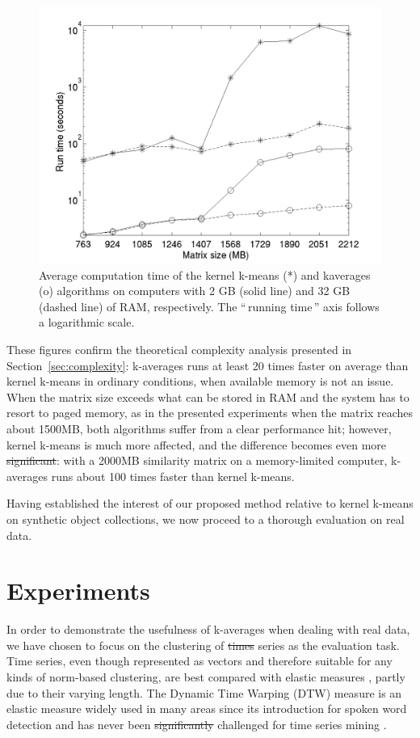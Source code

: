 \documentclass[natbib,smallextended]{svjour3}
\newcommand{\gl}[1]{``\,#1\,''} %
\providecommand{\DIFaddtex}[1]{{\protect\color{blue}\uwave{#1}}} %
\providecommand{\DIFdeltex}[1]{{\protect\color{red}\sout{#1}}}                      %
\providecommand{\DIFaddbegin}{} %
\providecommand{\DIFaddend}{} %
\providecommand{\DIFdelbegin}{} %
\providecommand{\DIFdelend}{} %
\providecommand{\DIFadd}[1]{\texorpdfstring{\DIFaddtex{#1}}{#1}} %
\providecommand{\DIFdel}[1]{\texorpdfstring{\DIFdeltex{#1}}{}} %
\begin{document}
\begin{figure}
\center
\includegraphics[width= .7\textwidth]{figures/simpleSwap.png}
\caption{Average computation time of the kernel k-means (*) and kaverages (o) algorithms on computers with 2 GB (solid line) and 32 GB (dashed line) of RAM, respectively. The \gl{running time} axis follows a logarithmic scale.}
\label{fig:timing}
\end{figure}

These figures confirm the theoretical complexity analysis presented in Section~\ref{sec:complexity}: k-averages runs at least 20 times faster on average than kernel k-means in ordinary conditions, when  available memory is not an issue. When the matrix size exceeds what can be stored in RAM and the system has to resort to paged memory, as in the presented experiments when the matrix reaches about 1500MB, both algorithms suffer from a clear performance hit; however, kernel k-means is much more affected, and the difference becomes even more \DIFdelbegin \DIFdel{significant}\DIFdelend \DIFaddbegin \DIFadd{important}\DIFaddend : with a 2000MB similarity matrix on a memory-limited computer, k-averages runs about 100 times faster than kernel k-means.

Having established the interest of our proposed method relative to kernel k-means on synthetic object collections, we now proceed to a thorough evaluation on real data.

\section{Experiments}
\label{sec:experiments}

In order to demonstrate the usefulness of k-averages when dealing with real data, we have chosen to focus on the clustering of \DIFdelbegin \DIFdel{times }\DIFdelend \DIFaddbegin \DIFadd{time }\DIFaddend series as the evaluation task. Time series, even though represented as vectors and therefore suitable for any kinds of norm-based clustering, are best compared with elastic measures \citep{Ding:2008:QMT:1454159.1454226, Wang:2013:ECR:2429736.2429754}, partly due to their varying length. The Dynamic Time Warping (DTW) measure is an elastic measure widely used in many areas since its introduction for spoken word detection \citep{1163055} and has never been \DIFdelbegin \DIFdel{significantly }\DIFdelend challenged for time series mining \citep{conf/kdd/BerndtC94, Rakthanmanon:2013:ABD:2513092.2500489}.
\end{document}
